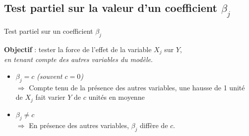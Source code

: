 \documentclass{BeamerTemplate}
\begin{document}
\subsection{Test partiel sur la valeur d'un coefficient $\beta_j$}

\begin{frame}{Test partiel sur un coefficient $\beta_j$ }

\textbf{Objectif} : tester la force de l'effet de la variable $X_j$ sur $Y$, \\
\hspace{1em} \textit{en tenant compte des autres variables du modèle}.

\vspace{0.4cm}

\begin{itemize}
      \item[$H_0$ :] $\beta_j = c$ \hfill \textit{(souvent $c = 0$)} \\
 \hspace{2em} $\Rightarrow$ Compte tenu de la présence des autres variables, une hausse de 1 unité de $X_j$ fait varier $Y$ de $c$ unités en moyenne 
  \vspace{0.3cm}
  \item[$H_1$ :] $\beta_j \neq c$ \\
\hspace{2em} $\Rightarrow$ En présence des autres variables, $\beta_j$ diffère de $c$.
\end{itemize}


\end{frame}
\end{document}
